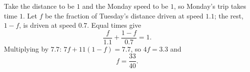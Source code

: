 Take the distance to be $1$ and the Monday speed to be $1$, so Monday's trip takes time $1$. Let $f$ be the fraction of Tuesday's distance driven at speed $1.1$; the rest, $1-f$, is driven at speed $0.7$. Equal times give
\[
\dfrac{f}{1.1}+\dfrac{1-f}{0.7}=1 .
\]
Multiplying by $7.7$: $7f+11(1-f)=7.7$, so $4f=3.3$ and
\[
f=\boxed{\dfrac{33}{40}}.
\]
